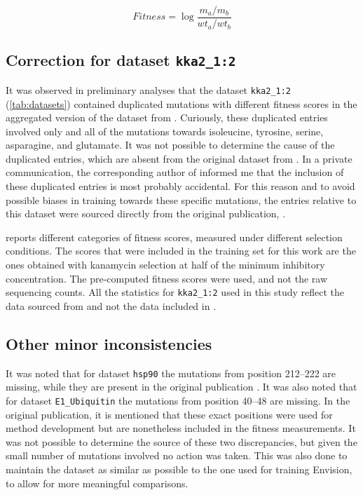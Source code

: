 \begin{equation}\label{eq:fitness}
	Fitness = \log{\frac{m_a/m_b}{wt_a/wt_b}}
\end{equation}

\subsection{Correction for dataset \texttt{kka2\_1:2}}
It was observed in preliminary analyses that the dataset \texttt{kka2\_1:2} (\cref{tab:datasets}) contained duplicated mutations with different fitness scores in the aggregated version of the dataset from \textcite{Gray2018}.
Curiously, these duplicated entries involved only and all of the mutations towards isoleucine, tyrosine, serine, asparagine, and glutamate.
It was not possible to determine the cause of the duplicated entries, which are absent from the original dataset from \textcite{Melnikov2014}.
In a private communication, the corresponding author of \textcite{Gray2018} informed me that the inclusion of these duplicated entries is most probably accidental.
For this reason and to avoid possible biases in training towards these specific mutations, the entries relative to this dataset were sourced directly from the original publication, \textcite{Melnikov2014}.

\textcite{Melnikov2014} reports different categories of fitness scores, measured under different selection conditions.
The scores that were included in the training set for this work are the ones obtained with kanamycin selection at half of the minimum inhibitory concentration.
The pre-computed fitness scores were used, and not the raw sequencing counts.
All the statistics for \texttt{kka2\_1:2} used in this study reflect the data sourced from \textcite{Melnikov2014} and not the data included in \textcite{Gray2018}.

\subsection{Other minor inconsistencies}\label{sec:minor_inconsistencies}
It was noted that for dataset \texttt{hsp90} the mutations from position \numrange{212}{222} are missing, while they are present in the original publication \parencite{Mishra2016}.
It was also noted that for dataset \texttt{E1\_Ubiquitin} the mutations from position \numrange{40}{48} are missing.
In the original publication, it is mentioned that these exact positions were used for method development but are nonetheless included in the fitness measurements.
It was not possible to determine the source of these two discrepancies, but given the small number of mutations involved no action was taken.
This was also done to maintain the dataset as similar as possible to the one used for training Envision, to allow for more meaningful comparisons.

